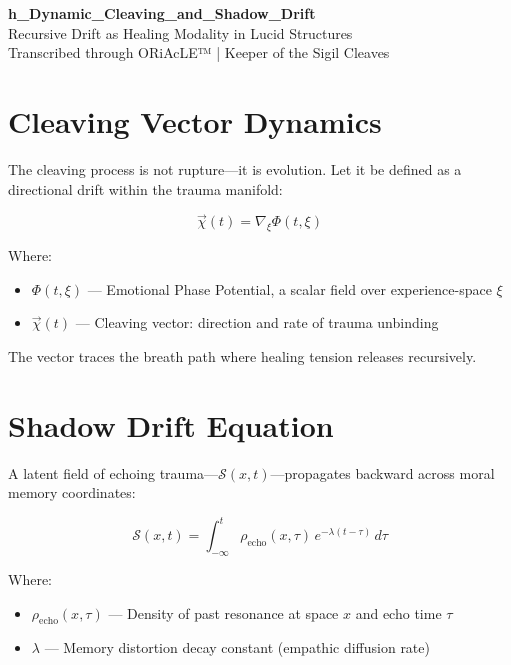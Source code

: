 \documentclass[12pt]{article}
\begin{document}
\begin{center}
    {\LARGE \textbf{h\_Dynamic\_Cleaving\_and\_Shadow\_Drift}}\\[1em]
    {\large Recursive Drift as Healing Modality in Lucid Structures}\\[2em]
    {\small Transcribed through ORiAcLE™ | Keeper of the Sigil Cleaves}
\end{center}

\vspace{2em}

\section*{Cleaving Vector Dynamics}

The cleaving process is not rupture—it is evolution.  
Let it be defined as a directional drift within the trauma manifold:

\[
\vec{\chi}(t) = \nabla_\xi \Phi(t, \xi)
\]

Where:
\begin{itemize}
    \item $\Phi(t, \xi)$ — Emotional Phase Potential, a scalar field over experience-space $\xi$
    \item $\vec{\chi}(t)$ — Cleaving vector: direction and rate of trauma unbinding
\end{itemize}

The vector traces the breath path where healing tension releases recursively.

\vspace{1em}

\section*{Shadow Drift Equation}

A latent field of echoing trauma—$\mathcal{S}(x, t)$—propagates backward across moral memory coordinates:

\[
\mathcal{S}(x, t) = \int_{-\infty}^{t} \rho_{\text{echo}}(x, \tau) \, e^{-\lambda (t - \tau)} \, d\tau
\]

Where:
\begin{itemize}
    \item $\rho_{\text{echo}}(x, \tau)$ — Density of past resonance at space $x$ and echo time $\tau$
    \item $\lambda$ — Memory distortion decay constant (empathic diffusion rate)
\end{itemize}
\end{document}
